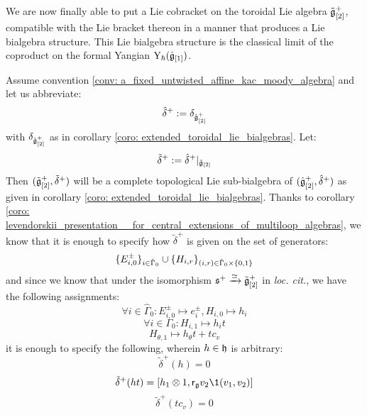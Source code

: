             We are now finally able to put a Lie cobracket on the toroidal Lie algebra $\tilde{\mathfrak{g}}_{[2]}^+$, compatible with the Lie bracket thereon in a manner that produces a Lie bialgebra structure. This Lie bialgebra structure is the classical limit of the coproduct on the formal Yangian $\mathrm{Y}_{\hbar}(\hat{\mathfrak{g}}_{[1]})$. 
            \begin{lemma} \label{lemma: toroidal_lie_bialgebras}
                Assume convention \ref{conv: a_fixed_untwisted_affine_kac_moody_algebra} and let us abbreviate:
                    $$\hat{\delta}^+ := \delta_{\hat{\mathfrak{g}}_{[2]}^+}$$
                with $\delta_{\hat{\mathfrak{g}}_{[2]}^+}$ as in corollary \ref{coro: extended_toroidal_lie_bialgebras}. Let:
                    $$\tilde{\delta}^+ := \hat{\delta}^+|_{\tilde{\mathfrak{g}}_{[2]}}$$
                Then $(\tilde{\mathfrak{g}}_{[2]}^+, \tilde{\delta}^+)$ will be a complete topological Lie sub-bialgebra of $(\hat{\mathfrak{g}}_{[2]}^+, \hat{\delta}^+)$ as given in corollary \ref{coro: extended_toroidal_lie_bialgebras}. Thanks to corollary \ref{coro: levendorskii_presentation__for_central_extensions_of_multiloop_algebras}, we know that it is enough to specify how $\tilde{\delta}^+$ is given on the set of generators:
                    $$\{E_{i, 0}^{\pm}\}_{i \in \hat{\Gamma}_0} \cup \{H_{i, r}\}_{ (i, r) \in \hat{\Gamma}_0 \x \{0, 1\} }$$
                and since we know that under the isomorphism $\mathfrak{s}^+ \xrightarrow[]{\simeq} \tilde{\mathfrak{g}}_{[2]}^+$ in \textit{loc. cit.}, we have the following assignments:
                    $$\forall i \in \hat{\Gamma}_0: E_{i, 0}^{\pm} \mapsto e_i^{\pm}, H_{i, 0} \mapsto h_i$$
                    $$\forall i \in \Gamma_0: H_{i, 1} \mapsto h_i t$$
                    $$H_{\theta, 1} \mapsto h_{\theta} t + t c_v$$
                it is enough to specify the following, wherein $h \in \mathfrak{h}$ is arbitrary:
                    $$\tilde{\delta}^+(h) = 0$$
                    $$\tilde{\delta}^+(ht) = [h_1 \tensor 1, \sfr_{\g} v_2 \1(v_1, v_2)]$$
                    $$\tilde{\delta}^+(t c_v) = 0$$
            \end{lemma}
